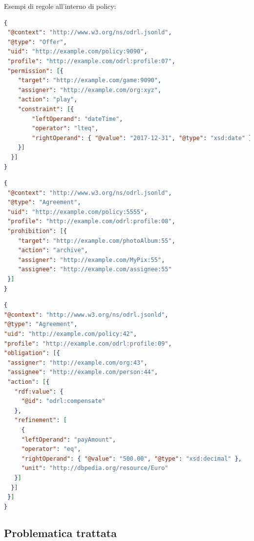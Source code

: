 \documentclass[12pt,a4paper,twoside]{book}
\begin{document}
Esempi di regole all'interno di policy:
\begin{lstlisting}[language=json,firstnumber=1,caption={La regola esprime il permesso di eseguire l'azione \textbf{play} sul target fino al giorno 2017-12-31 compreso},captionpos=b,label=esempioPerm]
{
 "@context": "http://www.w3.org/ns/odrl.jsonld",
 "@type": "Offer",
 "uid": "http://example.com/policy:9090",
 "profile": "http://example.com/odrl:profile:07",
 "permission": [{
    "target": "http://example.com/game:9090",
    "assigner": "http://example.com/org:xyz",
    "action": "play",
    "constraint": [{
        "leftOperand": "dateTime",
        "operator": "lteq",
        "rightOperand": { "@value": "2017-12-31", "@type": "xsd:date" }
    }]
  }]
}
\end{lstlisting}
\begin{lstlisting}[language=json,firstnumber=1,caption={La regola esprime il divieto di eseguire l'azione \textbf{archive} sul target},captionpos=b,label=esempioPro]
{
 "@context": "http://www.w3.org/ns/odrl.jsonld",
 "@type": "Agreement",
 "uid": "http://example.com/policy:5555",
 "profile": "http://example.com/odrl:profile:08",
 "prohibition": [{
	"target": "http://example.com/photoAlbum:55",
	"action": "archive",
	"assigner": "http://example.com/MyPix:55",
	"assignee": "http://example.com/assignee:55"
 }]
}
\end{lstlisting}

\begin{lstlisting}[language=json,firstnumber=1,caption={La regola esprime l'obbligo di eseguire l'azione \textbf{compensate}, specificando come \textbf{refinement} l'ammontare del pagamento},captionpos=b,label=esempioDuty]
{
"@context": "http://www.w3.org/ns/odrl.jsonld",
"@type": "Agreement",
"uid": "http://example.com/policy:42",
"profile": "http://example.com/odrl:profile:09",
"obligation": [{
 "assigner": "http://example.com/org:43",
 "assignee": "http://example.com/person:44",
 "action": [{
   "rdf:value": {
     "@id": "odrl:compensate"
   },
   "refinement": [
     {
     "leftOperand": "payAmount",
     "operator": "eq",
     "rightOperand": { "@value": "500.00", "@type": "xsd:decimal" },
     "unit": "http://dbpedia.org/resource/Euro"
   }]
  }]
 }]
}
\end{lstlisting}
\subsection{Problematica trattata}
\end{document}
